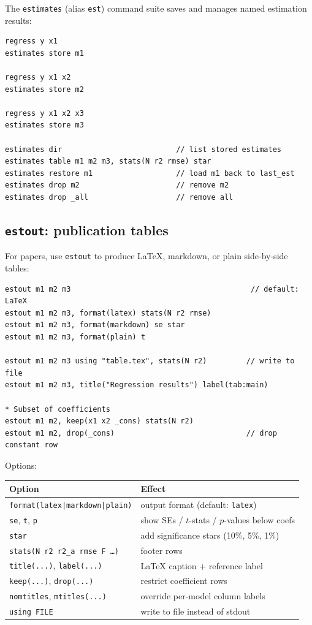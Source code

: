 \documentclass[11pt,letterpaper]{article}
\begin{document}
The \texttt{estimates} (alias \texttt{est}) command suite saves and
manages named estimation results:

\begin{lstlisting}
regress y x1
estimates store m1

regress y x1 x2
estimates store m2

regress y x1 x2 x3
estimates store m3

estimates dir                          // list stored estimates
estimates table m1 m2 m3, stats(N r2 rmse) star
estimates restore m1                   // load m1 back to last_est
estimates drop m2                      // remove m2
estimates drop _all                    // remove all
\end{lstlisting}

\subsection{\texttt{estout}: publication tables}

For papers, use \texttt{estout} to produce LaTeX, markdown, or plain
side-by-side tables:

\begin{lstlisting}
estout m1 m2 m3                                         // default: LaTeX
estout m1 m2 m3, format(latex) stats(N r2 rmse)
estout m1 m2 m3, format(markdown) se star
estout m1 m2 m3, format(plain) t

estout m1 m2 m3 using "table.tex", stats(N r2)         // write to file
estout m1 m2 m3, title("Regression results") label(tab:main)

* Subset of coefficients
estout m1 m2, keep(x1 x2 _cons) stats(N r2)
estout m1 m2, drop(_cons)                              // drop constant row
\end{lstlisting}

Options:

\begin{center}
\begin{tabular}{ll}
\toprule
Option & Effect \\
\midrule
\texttt{format(latex|markdown|plain)} & output format (default: \texttt{latex}) \\
\texttt{se}, \texttt{t}, \texttt{p} & show SEs / $t$-stats / $p$-values below coefs \\
\texttt{star} & add significance stars (10\%, 5\%, 1\%) \\
\texttt{stats(N r2 r2\_a rmse F \ldots)} & footer rows \\
\texttt{title(...)}, \texttt{label(...)} & LaTeX caption + reference label \\
\texttt{keep(...)}, \texttt{drop(...)} & restrict coefficient rows \\
\texttt{nomtitles}, \texttt{mtitles(...)} & override per-model column labels \\
\texttt{using FILE} & write to file instead of stdout \\
\bottomrule
\end{tabular}
\end{center}
\end{document}
